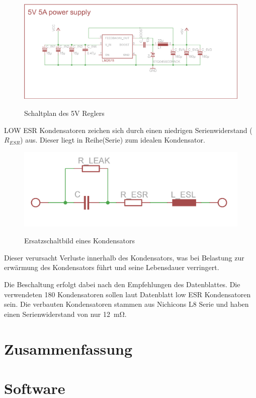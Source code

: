 \begin{figure}[H]
\centering
\includegraphics[width=.8\textwidth]{5vregler.png}\\
\caption{Schaltplan des 5V Reglers}%
\label{fig:vreg}
\end{figure}


LOW ESR Kondensatoren zeichen sich durch einen niedrigen Serienwiderstand ($R_{ESR}$) aus.
Dieser liegt in Reihe(Serie) zum idealen Kondensator.

\begin{figure}[H]
\centering
\includegraphics[width=.8\textwidth]{esr.png}\\
\caption{Ersatzschaltbild eines Kondensators}%
\label{fig:esr}
\end{figure}

Dieser verursacht Verluste innerhalb des Kondensators, was bei Belastung zur erwärmung des Kondensators führt und seine Lebensdauer verringert.



Die Beschaltung erfolgt dabei nach den Empfehlungen des Datenblattes. Die verwendeten \SI{180}{\uF} Kondensatoren sollen laut Datenblatt low ESR Kondensatoren sein. Die verbauten Kondensatoren stammen aus Nichicons L8 Serie und haben einen Serienwiderstand von nur \SI{12}{\mohm}.

\section{Zusammenfassung}




\section{Software}

